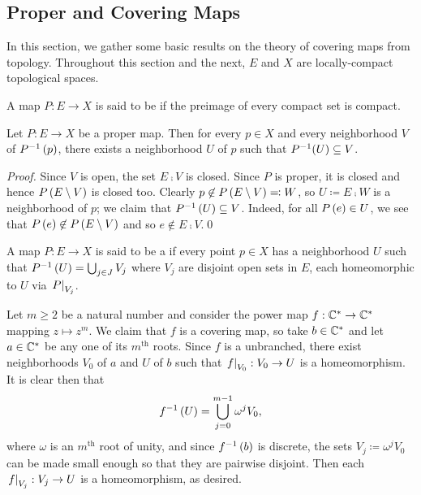 \documentclass[../Moduli_Spaces_of_Riemann_Surfaces.tex]{subfiles}
\begin{document}
    \subsection{Proper and Covering Maps}
    In this section, we gather some basic results on the theory of covering maps from topology. Throughout this section and the next, $E$ and $X$ are locally-compact topological spaces.
    \begin{definition}
        A map $P:E\to X$ is said to be  if the preimage of every compact set is compact.
    \end{definition}
    \begin{proposition}\label{1.3:prp:proper_give_neighborhoods}
        Let $P:E\to X$ be a proper map. Then for every $p\in X$ and every neighborhood $V$ of $P^{-1}\left(p\right)$, there exists a neighborhood $U$ of $p$ such that $P^{-1}\!\left(U\right)\subseteq V$.
    \end{proposition}
    \begin{proof}
        Since $V$ is open, the set $E\comp V$ is closed. Since $P$ is proper, it is closed and hence $P\left(E\setminus V\right)$ is closed too. Clearly $p\not\in P\left(E\setminus V\right)\eqqcolon W$, so $U\coloneqq E\comp W$ is a neighborhood of $p$; we claim that $P^{-1}\left(U\right)\subseteq V$. Indeed, for all $P\left(e\right)\in U$, we see that $P\left(e\right)\not\in P\left(E\setminus V\right)$ and so $e\not\in E\comp V$.\qed
    \end{proof}
    \begin{definition}
        A map $P:E\to X$ is said to be a  if every point $p\in X$ has a neighborhood $U$ such that $P^{-1}\left(U\right)=\bigcup_{j\in J}V_j$ where $V_j$ are disjoint open sets in $E$, each homeomorphic to $U$ via $\left.P\right|_{V_j}$.
    \end{definition}
    \begin{example}
        Let $m\geq2$ be a natural number and consider the power map $f:\mathbb{C}^\ast\to\mathbb{C}^\ast$ mapping $z\mapsto z^m$. We claim that $f$ is a covering map, so take $b\in\mathbb{C}^\ast$ and let $a\in\mathbb{C}^\ast$ be any one of its $m^\textrm{th}$ roots. Since $f$ is a unbranched, there exist neighborhoods $V_0$ of $a$ and $U$ of $b$ such that $\left.f\right|_{V_0}:V_0\to U$ is a homeomorphism. It is clear then that
        \vspace{-0.05in}
        \begin{equation*}
            f^{-1}\left(U\right)=\bigcup_{j=0}^{m-1}\omega^jV_0,
        \end{equation*}
        where $\omega$ is an $m^\textrm{th}$ root of unity, and since $f^{-1}\left(b\right)$ is discrete, the sets $V_j\coloneqq\omega^jV_0$ can be made small enough so that they are pairwise disjoint. Then each $\left.f\right|_{V_j}:V_j\to U$ is a homeomorphism, as desired.\exqed
    \end{example}
\end{document}
